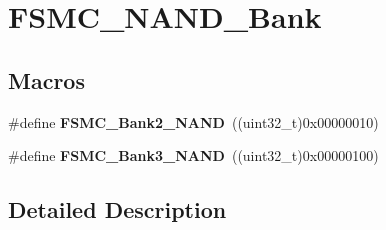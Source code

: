 \hypertarget{group___f_s_m_c___n_a_n_d___bank}{\section{F\-S\-M\-C\-\_\-\-N\-A\-N\-D\-\_\-\-Bank}
\label{group___f_s_m_c___n_a_n_d___bank}
}
\subsection*{Macros}
\begin{DoxyCompactItemize}
\item 
\hypertarget{group___f_s_m_c___n_a_n_d___bank_ga294e7134aa329a09e56b61eec9882a27}{\#define {\bfseries F\-S\-M\-C\-\_\-\-Bank2\-\_\-\-N\-A\-N\-D}~((uint32\-\_\-t)0x00000010)}\label{group___f_s_m_c___n_a_n_d___bank_ga294e7134aa329a09e56b61eec9882a27}

\item 
\hypertarget{group___f_s_m_c___n_a_n_d___bank_gaf72def0732c026b0245d721ee371c85b}{\#define {\bfseries F\-S\-M\-C\-\_\-\-Bank3\-\_\-\-N\-A\-N\-D}~((uint32\-\_\-t)0x00000100)}\label{group___f_s_m_c___n_a_n_d___bank_gaf72def0732c026b0245d721ee371c85b}

\end{DoxyCompactItemize}


\subsection{Detailed Description}
